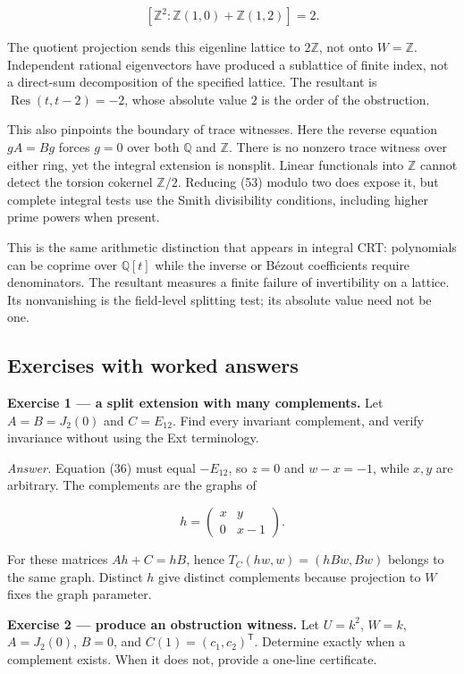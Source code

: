 \documentclass[
  11pt,
]{article}
\begin{document}
\[[\mathbb Z^2:\mathbb Z(1,0)+\mathbb Z(1,2)]=2.\tag{54}\]

The quotient projection sends this eigenline lattice to \(2\mathbb Z\),
not onto \(W=\mathbb Z\). Independent rational eigenvectors have
produced a sublattice of finite index, not a direct-sum decomposition of
the specified lattice. The resultant is
\(\operatorname{Res}(t,t-2)=-2\), whose absolute value \(2\) is the
order of the obstruction.

This also pinpoints the boundary of trace witnesses. Here the reverse
equation \(gA=Bg\) forces \(g=0\) over both \(\mathbb Q\) and
\(\mathbb Z\). There is no nonzero trace witness over either ring, yet
the integral extension is nonsplit. Linear functionals into
\(\mathbb Z\) cannot detect the torsion cokernel \(\mathbb Z/2\).
Reducing (53) modulo two does expose it, but complete integral tests use
the Smith divisibility conditions, including higher prime powers when
present.

This is the same arithmetic distinction that appears in integral CRT:
polynomials can be coprime over \(\mathbb Q[t]\) while the inverse or
Bézout coefficients require denominators. The resultant measures a
finite failure of invertibility on a lattice. Its nonvanishing is the
field-level splitting test; its absolute value need not be one.

\subsection{Exercises with worked
answers}\label{exercises-with-worked-answers}

\textbf{Exercise 1 --- a split extension with many complements.} Let
\(A=B=J_2(0)\) and \(C=E_{12}\). Find every invariant complement, and
verify invariance without using the Ext terminology.

\emph{Answer.} Equation (36) must equal \(-E_{12}\), so \(z=0\) and
\(w-x=-1\), while \(x,y\) are arbitrary. The complements are the graphs
of

\[h=\begin{pmatrix}x&y\\0&x-1\end{pmatrix}.\]

For these matrices \(Ah+C=hB\), hence \(T_C(hw,w)=(hBw,Bw)\) belongs to
the same graph. Distinct \(h\) give distinct complements because
projection to \(W\) fixes the graph parameter.

\textbf{Exercise 2 --- produce an obstruction witness.} Let \(U=k^2\),
\(W=k\), \(A=J_2(0)\), \(B=0\), and \(C(1)=(c_1,c_2)^{\mathsf T}\).
Determine exactly when a complement exists. When it does not, provide a
one-line certificate.
\end{document}
